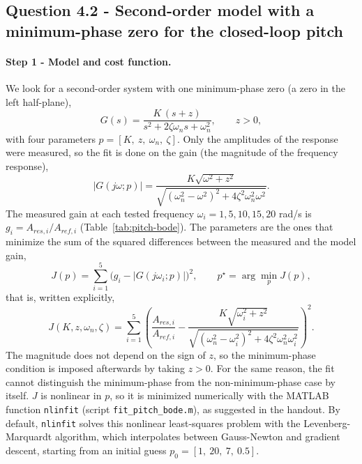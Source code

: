 \subsection*{Question 4.2 - Second-order model with a minimum-phase zero for the closed-loop pitch}

\paragraph{Step 1 - Model and cost function.}
We look for a second-order system with one minimum-phase zero (a zero in the left half-plane),
\begin{equation*}
G(s) = \frac{K\,(s + z)}{s^2 + 2\zeta\omega_n s + \omega_n^2}, \qquad z > 0 ,
\end{equation*}
with four parameters $p = [K,\ z,\ \omega_n,\ \zeta]$.
Only the amplitudes of the response were measured, so the fit is done on the gain (the magnitude of the frequency response),
\begin{equation*}
|G(j\omega; p)| = \frac{K\sqrt{\omega^2 + z^2}}{\sqrt{(\omega_n^2 - \omega^2)^2 + 4\zeta^2\omega_n^2\omega^2}} .
\end{equation*}
The measured gain at each tested frequency $\omega_i = 1, 5, 10, 15, 20$ rad/s is $g_i = A_{res,i}/A_{ref,i}$ (Table~\ref{tab:pitch-bode}).
The parameters are the ones that minimize the sum of the squared differences between the measured and the model gain,
\begin{equation*}
J(p) = \sum_{i=1}^{5} \big( g_i - |G(j\omega_i; p)| \big)^2 , \qquad p^\star = \arg\min_p J(p) ,
\end{equation*}
that is, written explicitly,
\begin{equation*}
J(K, z, \omega_n, \zeta) = \sum_{i=1}^{5} \left( \frac{A_{res,i}}{A_{ref,i}} - \frac{K\sqrt{\omega_i^2 + z^2}}{\sqrt{(\omega_n^2 - \omega_i^2)^2 + 4\zeta^2\omega_n^2\omega_i^2}} \right)^2 .
\end{equation*}
The magnitude does not depend on the sign of $z$, so the minimum-phase condition is imposed afterwards by taking $z > 0$.
For the same reason, the fit cannot distinguish the minimum-phase from the non-minimum-phase case by itself.
$J$ is nonlinear in $p$, so it is minimized numerically with the MATLAB function \texttt{nlinfit} (script \texttt{fit\_pitch\_bode.m}), as suggested in the handout.
By default, \texttt{nlinfit} solves this nonlinear least-squares problem with the Levenberg-Marquardt algorithm, which interpolates between Gauss-Newton and gradient descent, starting from an initial guess $p_0 = [1,\ 20,\ 7,\ 0.5]$.

